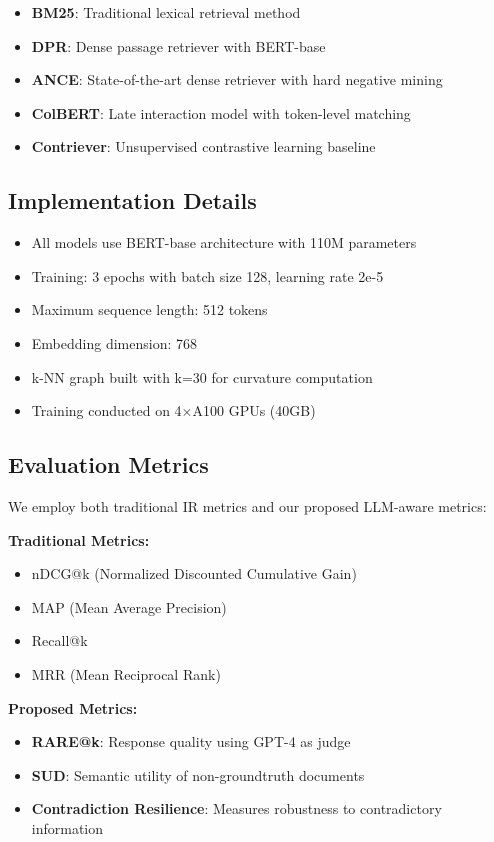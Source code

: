 \begin{itemize}
    \item \textbf{BM25}: Traditional lexical retrieval method
    \item \textbf{DPR}: Dense passage retriever with BERT-base
    \item \textbf{ANCE}: State-of-the-art dense retriever with hard negative mining
    \item \textbf{ColBERT}: Late interaction model with token-level matching
    \item \textbf{Contriever}: Unsupervised contrastive learning baseline
\end{itemize}

\subsection{Implementation Details}

\begin{itemize}
    \item All models use BERT-base architecture with 110M parameters
    \item Training: 3 epochs with batch size 128, learning rate 2e-5
    \item Maximum sequence length: 512 tokens
    \item Embedding dimension: 768
    \item k-NN graph built with k=30 for curvature computation
    \item Training conducted on 4×A100 GPUs (40GB)
\end{itemize}

\subsection{Evaluation Metrics}

We employ both traditional IR metrics and our proposed LLM-aware metrics:

\textbf{Traditional Metrics:}
\begin{itemize}
    \item nDCG@k (Normalized Discounted Cumulative Gain)
    \item MAP (Mean Average Precision)
    \item Recall@k
    \item MRR (Mean Reciprocal Rank)
\end{itemize}

\textbf{Proposed Metrics:}
\begin{itemize}
    \item \textbf{RARE@k}: Response quality using GPT-4 as judge
    \item \textbf{SUD}: Semantic utility of non-groundtruth documents
    \item \textbf{Contradiction Resilience}: Measures robustness to contradictory information
\end{itemize}

